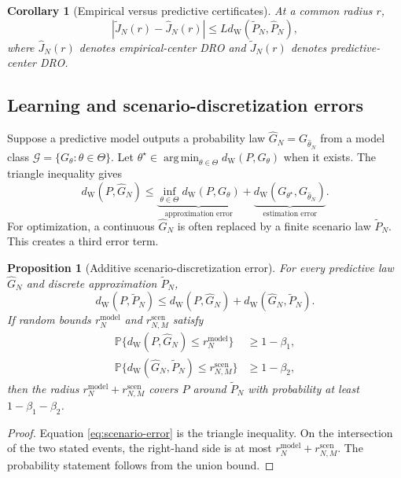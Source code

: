 \documentclass[11pt]{article}
\newtheorem{proposition}[theorem]{Proposition}
\newtheorem{corollary}[theorem]{Corollary}
\newcommand{\Prob}{\mathbb{P}}
\newcommand{\1}{\mathbf{1}}
\newcommand{\dW}{d_{\mathrm W}}
\newcommand{\Phat}{\widehat P_N}
\newcommand{\Ptil}{\widetilde P_N}
\DeclareMathOperator*{\argmin}{arg\,min}
\begin{document}
\begin{corollary}[Empirical versus predictive certificates]\label{cor:center-stability}
At a common radius $r$,
\begin{equation}
    |\widetilde J_N(r)-\widehat J_N(r)|
    \le L\dW(\Ptil,\Phat),
\end{equation}
where $\widehat J_N(r)$ denotes empirical-center DRO and $\widetilde J_N(r)$ denotes predictive-center DRO.
\end{corollary}

\subsection{Learning and scenario-discretization errors}

Suppose a predictive model outputs a probability law $\widehat G_N=G_{\widehat\theta_N}$ from a model class $\mathcal G=\{G_\theta:\theta\in\Theta\}$. Let $\theta^\star\in\argmin_{\theta\in\Theta}\dW(P,G_\theta)$ when it exists. The triangle inequality gives
\begin{equation}\label{eq:error-decomp}
    \dW(P,\widehat G_N)
    \le \underbrace{\inf_{\theta\in\Theta}\dW(P,G_\theta)}_{\text{approximation error}}
    +\underbrace{\dW(G_{\theta^\star},G_{\widehat\theta_N})}_{\text{estimation error}}.
\end{equation}
For optimization, a continuous $\widehat G_N$ is often replaced by a finite scenario law $\Ptil$. This creates a third error term.

\begin{proposition}[Additive scenario-discretization error]\label{prop:scenario-error}
For every predictive law $\widehat G_N$ and discrete approximation $\Ptil$,
\begin{equation}\label{eq:scenario-error}
    \dW(P,\Ptil)
    \le \dW(P,\widehat G_N)+\dW(\widehat G_N,\Ptil).
\end{equation}
If random bounds $r_N^{\mathrm{model}}$ and $r_{N,M}^{\mathrm{scen}}$ satisfy
\begin{align}
\Prob\{\dW(P,\widehat G_N)\le r_N^{\mathrm{model}}\}&\ge1-\beta_1,\\
\Prob\{\dW(\widehat G_N,\Ptil)\le r_{N,M}^{\mathrm{scen}}\}&\ge1-\beta_2,
\end{align}
then the radius $r_N^{\mathrm{model}}+r_{N,M}^{\mathrm{scen}}$ covers $P$ around $\Ptil$ with probability at least $1-\beta_1-\beta_2$.
\end{proposition}

\begin{proof}
Equation \eqref{eq:scenario-error} is the triangle inequality. On the intersection of the two stated events, the right-hand side is at most $r_N^{\mathrm{model}}+r_{N,M}^{\mathrm{scen}}$. The probability statement follows from the union bound.
\end{proof}
\end{document}
